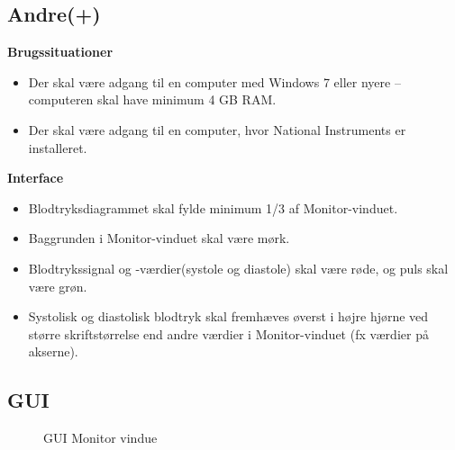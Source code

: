 \subsection{Andre(+)}
\textbf{Brugssituationer}
\begin{itemize}
	\item Der skal være adgang til en computer med Windows 7 eller nyere – computeren skal have minimum 4 GB RAM.
	\item Der skal være adgang til en computer, hvor National Instruments er installeret.
\end{itemize}
\textbf{Interface}
\begin{itemize}
	\item Blodtryksdiagrammet skal fylde minimum 1/3 af Monitor-vinduet.
	\item Baggrunden i Monitor-vinduet skal være mørk.
	\item Blodtrykssignal og -værdier(systole og diastole) skal være røde, og puls skal være grøn.
	\item Systolisk og diastolisk blodtryk skal fremhæves øverst i højre hjørne ved større skriftstørrelse end andre værdier i Monitor-vinduet (fx værdier på akserne).
\end{itemize}

\subsection{GUI}
\begin{figure}[H]
	\centering
	\caption{GUI  Monitor vindue}
	\label{fig:GUI  Monitor vindue}
\end{figure}










